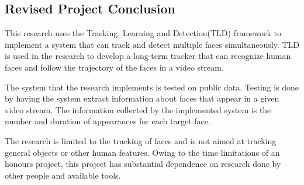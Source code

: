 \subsection{Revised Project Conclusion}
This research uses the Tracking, Learning and Detection(TLD) framework to implement a system that can track and detect multiple faces simultaneously.
TLD is used in the research to develop a long-term tracker that can recognize human faces and follow the trajectory of the faces in a video stream.

The system that the research implements is tested on public data.
Testing is done by having the system extract information about faces that appear in a given video stream.
The information collected by the implemented system is the number and duration of appearances for each target face. 

The research is limited to the tracking of faces and is not aimed at tracking general objects or other human features.
Owing to the time limitations of an honours project, this project has substantial dependence on research done by other people and available tools.
